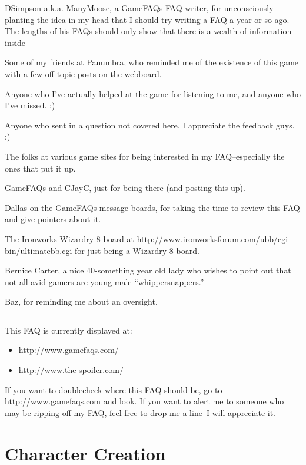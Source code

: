\documentclass[12pt]{article}
\providecommand{\tightlist}{%
  \setlength{\itemsep}{0pt}\setlength{\parskip}{0pt}}
\begin{document}
DSimpson a.k.a. ManyMoose, a GameFAQs FAQ writer, for unconsciously
planting the idea in my head that I should try writing a FAQ a year or
so ago. The lengths of his FAQs should only show that there is a wealth
of information inside

Some of my friends at Panumbra, who reminded me of the existence of this
game with a few off-topic posts on the webboard.

Anyone who I've actually helped at the game for listening to me, and
anyone who I've missed. :)

Anyone who sent in a question not covered here. I appreciate the
feedback guys. :)

The folks at various game sites for being interested in my
FAQ--especially the ones that put it up.

GameFAQs and CJayC, just for being there (and posting this up).

Dallas on the GameFAQs message boards, for taking the time to review
this FAQ and give pointers about it.

The Ironworks Wizardry 8 board at
\url{http://www.ironworksforum.com/ubb/cgi-bin/ultimatebb.cgi} for just
being a Wizardry 8 board.

Bernice Carter, a nice 40-something year old lady who wishes to point
out that not all avid gamers are young male ``whippersnappers.''

Baz, for reminding me about an oversight.

\begin{center}\rule{0.5\linewidth}{\linethickness}\end{center}

This FAQ is currently displayed at:

\begin{itemize}
\tightlist
\item
  \url{http://www.gamefaqs.com/}
\item
  \url{http://www.the-spoiler.com/}
\end{itemize}

If you want to doublecheck where this FAQ should be, go to
\url{http://www.gamefaqs.com} and look. If you want to alert me to
someone who may be ripping off my FAQ, feel free to drop me a line--I
will appreciate it.

\section{Character Creation}\label{character-creation}
\end{document}
